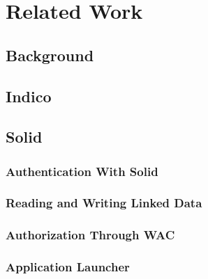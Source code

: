 \chapter{Related Work}

\section{Background}

\section{Indico}

\subsection{}

\section{Solid}

\subsection{Authentication With Solid}

\subsection{Reading and Writing Linked Data}

\subsection{Authorization Through WAC}

\subsection{Application Launcher}
